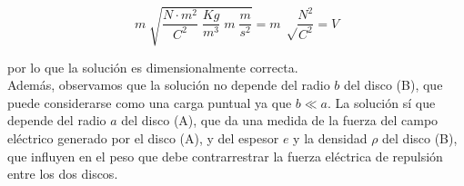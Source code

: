 \begin{equation*}
    m \; \sqrt {\frac{N \cdot m^2} {C^2} \; \frac{Kg}{m^3} \;  m  \; \frac{m}{s^2}} =
    m   \; \sqrt \frac{N^2}{C^2} = V
\end{equation*}

por lo que la solución es dimensionalmente correcta.\\

Además, observamos que la solución no depende del radio $b$ del disco (B),
que puede considerarse como una carga puntual ya que $b \ll a$. La solución sí que depende del radio $a$ del disco (A), que
da una medida de la fuerza del campo eléctrico generado por el disco (A), y del espesor $e$ y la densidad $\rho$ del disco (B),
que influyen en el peso que debe contrarrestrar la fuerza eléctrica de repulsión entre los dos discos.

